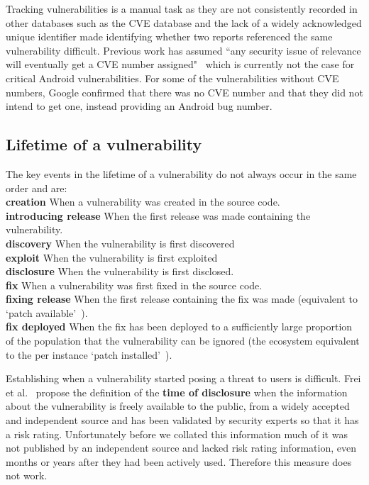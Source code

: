 \documentclass[conference,a4paper,twoside]{IEEEtran}
\let\OldTodo\todo
\renewcommand{\todo}{\OldTodo[inline]}
\newcommand{\todolater}[1]{}%
\begin{document}
Tracking vulnerabilities is a manual task as they are not consistently recorded in other databases such as the CVE database and the lack of a widely acknowledged unique identifier made identifying whether two reports referenced the same vulnerability difficult.
Previous work has assumed ``any security issue of relevance will eventually get a CVE number assigned"~\cite{Frei2010} which is currently not the case for critical Android vulnerabilities.
For some of the vulnerabilities without CVE numbers, Google confirmed that there was no CVE number and that they did not intend to get one, instead providing an Android bug number.


\subsection{Lifetime of a vulnerability}

The key events in the lifetime of a vulnerability do not always occur in the same order and are:\\
\textbf{creation} When a vulnerability was created in the source code.\\
\textbf{introducing release} When the first release was made containing the vulnerability.\\
\textbf{discovery} When the vulnerability is first discovered\\
\textbf{exploit} When the vulnerability is first exploited\\
\textbf{disclosure} When the vulnerability is first disclosed.\\ %
\textbf{fix} When a vulnerability was first fixed in the source code.\\
\textbf{fixing release} When the first release containing the fix was made (equivalent to `patch available'~\cite{Frei2010}).\\
\textbf{fix deployed} When the fix has been deployed to a sufficiently large proportion of the population that the vulnerability can be ignored (the ecosystem equivalent to the per instance `patch installed'~\cite{Frei2010}).
\todolater{Does this look nice?}


Establishing when a vulnerability started posing a threat to users is difficult.
Frei et al.~\cite{Frei2010} propose the definition of the {\bf time of disclosure} when the information about the vulnerability is freely available to the public, from a widely accepted and independent source and has been validated by security experts so that it has a risk rating.
Unfortunately before we collated this information much of it was not published by an independent source and lacked risk rating information, even months or years after they had been actively used.
Therefore this measure does not work.
\end{document}
